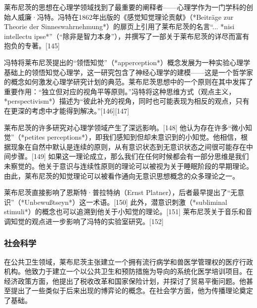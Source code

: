 莱布尼茨的思想在心理学领域找到了最重要的阐释者——心理学作为一门学科的创始人威廉·冯特。冯特在1862年出版的《感觉知觉理论贡献》（*Beiträge zur Theorie der Sinneswahrnehmung*）的扉页上引用了莱布尼茨的名言“... *nisi intellectu ipse*”（“除非是智力本身”），并撰写了一部关于莱布尼茨的详尽而富有抱负的专著。[145]  

冯特将莱布尼茨提出的“领悟知觉”（*apperception*）概念发展为一种实验心理学基础上的领悟知觉心理学，这一研究包含了神经心理学的建模——这是一个哲学家的概念如何激发心理学研究计划的典范。莱布尼茨思想中的一个原则在其中发挥了重要作用：“独立但对应的视角平等原则。”冯特将这种思维方式（观点主义，*perspectivism*）描述为“彼此补充的视角，同时也可能表现为相反的观点，只有在更深的考虑中才能得到解决。”[146][147]  

莱布尼茨的许多研究对心理学领域产生了深远影响。[148] 他认为存在许多“微小知觉”（*petites perceptions*），即我们感知到但却未意识到的小知觉。他相信，根据现象在自然中默认是连续的原则，从有意识状态到无意识状态之间很可能存在中间步骤。[149] 如果这一理论成立，那么我们在任何时候都会有一部分思维是我们未察觉的。他关于意识与连续性原则的理论可以被视为关于睡眠阶段的早期理论。由此，莱布尼茨的知觉理论可以被看作通向无意识思想概念的众多理论之一。  

莱布尼茨直接影响了恩斯特·普拉特纳（Ernst Platner），后者最早提出了“无意识”（*Unbewußtseyn*）这一术语。[150] 此外，潜意识刺激（*subliminal stimuli*）的概念也可以追溯到他关于小知觉的理论。[151] 莱布尼茨关于音乐和音调知觉的观点进一步影响了冯特的实验室研究。[152]
\subsubsection{社会科学}
在公共卫生领域，莱布尼茨主张建立一个拥有流行病学和兽医学管理权的医疗行政机构。他致力于建立一个以公共卫生和预防措施为导向的系统化医学培训项目。在经济政策方面，他提出了税收改革和国家保险计划，并探讨了贸易平衡问题。他甚至提出了一些类似于后来出现的博弈论的概念。在社会学方面，他为传播理论奠定了基础。